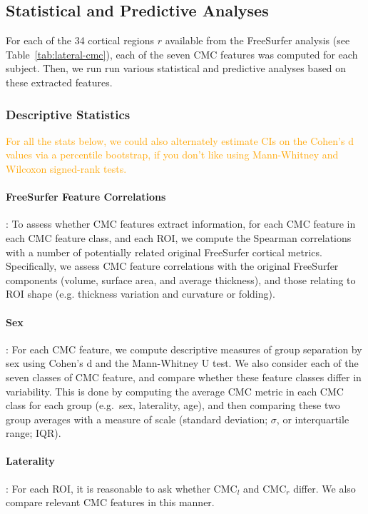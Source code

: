 \documentclass{article}
\begin{document}
\subsection{Statistical and Predictive Analyses}

For each of the 34 cortical regions \(r\) available from the FreeSurfer
analysis (see Table~\ref{tab:lateral-cmc}), each of the seven CMC features was
computed for each subject. Then, we run run various statistical and
predictive analyses based on these extracted features.

\subsubsection{Descriptive Statistics}

\textcolor{orange}{For all the stats below, we could also alternately
estimate CIs on the Cohen's d values via a percentile bootstrap, if you don't
like using Mann-Whitney and Wilcoxon signed-rank tests.}

\paragraph{FreeSurfer Feature Correlations}: To assess whether CMC features
extract  information, for each CMC feature in each CMC
feature class, and each ROI, we compute the Spearman correlations with a
number of potentially related original FreeSurfer cortical metrics.
Specifically, we assess CMC feature correlations with the original FreeSurfer
components (volume, surface area, and average thickness), and those relating
to ROI shape (e.g. thickness variation and curvature or folding).

\paragraph{Sex}: For each CMC feature, we compute descriptive measures of
group separation by sex using Cohen's d and the Mann-Whitney U test. We also
consider each of the seven classes of CMC feature, and compare whether these
feature classes differ in variability. This is done by computing the average
CMC metric in each CMC class for each group (e.g.\ sex, laterality, age), and
then comparing these two group averages with a measure of scale (standard
deviation; \(\sigma\), or interquartile range; IQR).

\paragraph{Laterality}: For each ROI, it is reasonable to ask whether
\(\text{CMC}_l\) and \(\text{CMC}_r\) differ. We also compare relevant CMC
features in this manner.
\end{document}
